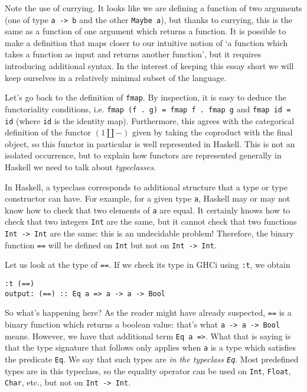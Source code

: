 \documentclass[11pt]{article}
\theoremstyle{nonumberplain}
\newcommand{\blank}{{-}}
\newcommand*\lsin{\lstinline}
\begin{document}
Note the use of currying. It looks like we are defining a function of two arguments (one of type \lsin|a -> b| and the other \lsin|Maybe a|), but thanks to currying, this is the same as a function of one argument which returns a function. It is possible to make a definition that maps closer to our intuitive notion of `a function which takes a function as input and returns another function', but it requires introducing additional syntax. In the interest of keeping this essay short we will keep ourselves in a relatively minimal subset of the language.

Let's go back to the definition of \lsin|fmap|. By inspection, it is easy to deduce the functoriality conditions, i.e. \lsin|fmap (f . g) = fmap f . fmap g| and \lsin|fmap id = id| (where \lsin|id| is the identity map). Furthermore, this agrees with the categorical definition of the functor $(1 \amalg \blank)$ given by taking the coproduct with the final object, so this functor in particular is well represented in Haskell. This is not an isolated occurrence, but to explain how functors are represented generally in Haskell we need to talk about \emph{typeclasses}.

In Haskell, a typeclass corresponds to additional structure that a type or type constructor can have. For example, for a given type \lsin|a|, Haskell may or may not know how to check that two elements of \lsin|a| are equal. It certainly knows how to check that two integers \lsin|Int| are the same, but it cannot check that two functions \lsin|Int -> Int| are the same: this is an undecidable problem! Therefore, the binary function \lsin|==| will be defined on \lsin|Int| but not on \lsin|Int -> Int|.

Let us look at the type of \lsin|==|. If we check its type in GHCi using \lsin|:t|, we obtain
\begin{lstlisting}
:t (==)
output: (==) :: Eq a => a -> a -> Bool
\end{lstlisting}

So what's happening here? As the reader might have already suspected, \lsin|==| is a binary function which returns a boolean value: that's what \lsin|a -> a -> Bool| means. However, we have that additional term \lsin|Eq a =>|. What that is saying is that the type signature that follows only applies when \lsin|a| is a type which satisfies the predicate \lsin|Eq|. We say that such types are \emph{in the typeclass \lsin|Eq|}. Most predefined types are in this typeclass, so the equality operator can be used on \lsin|Int|, \lsin|Float|, \lsin|Char|, etc., but not on \lsin|Int -> Int|.
\end{document}
